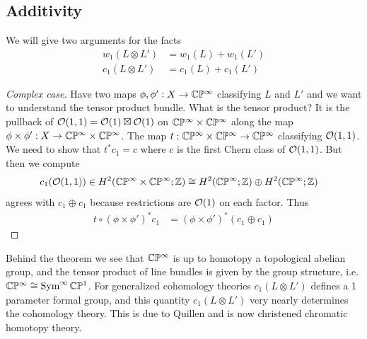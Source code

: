 \documentclass[12pt]{article}
\begin{document}
\subsection{Additivity}
We will give two arguments for the facts \begin{align*}
    w_1(L\otimes L') &= w_1(L) + w_1(L') \\
    c_1(L\otimes L') &= c_1(L) + c_1(L')
\end{align*}

\begin{proof}
    [Complex case] Have two maps $\phi,\phi': X \to \mathbb{C}\mathbb{P}^\infty$ classifying $L$ and $L'$ and we want to understand the tensor product bundle. What is the tensor product? It is the pullback of ${\mathcal{O}}(1,1) = {\mathcal{O}}(1)\boxtimes {\mathcal{O}}(1)$ on $\mathbb{C}\mathbb{P}^\infty \times \mathbb{C}\mathbb{P}^\infty$ along the map $\phi\times \phi': X \to \mathbb{C}\mathbb{P}^\infty \times \mathbb{C}\mathbb{P}^\infty$. The map $t: \mathbb{C}\mathbb{P}^\infty \times \mathbb{C}\mathbb{P}^\infty \to \mathbb{C}\mathbb{P}^\infty$ classifying ${\mathcal{O}}(1,1)$. We need to show that $t^* c_1 = c$ where $c$ is the first Chern class of ${\mathcal{O}}(1,1)$. But then we compute \begin{align*}
        c_1({\mathcal{O}}(1,1)) \in H^2(\mathbb{C}\mathbb{P}^\infty \times \mathbb{C}\mathbb{P}^\infty; \mathbb{Z}) &\cong H^2(\mathbb{C}\mathbb{P}^\infty; \mathbb{Z}) \oplus H^2(\mathbb{C}\mathbb{P}^\infty; \mathbb{Z}) 
    \end{align*} agrees with $c_1 \oplus c_1$ because restrictions are ${\mathcal{O}}(1)$ on each factor. Thus \begin{align*}
        t\circ (\phi\times \phi')^* c_1 &= (\phi\times \phi')^* (c_1 \oplus c_1) 
    \end{align*}
\end{proof}

\begin{remark}
    Behind the theorem we see that $\mathbb{C}\mathbb{P}^\infty$ is up to homotopy a topological abelian group, and the tensor product of line bundles is given by the group structure, i.e. $\mathbb{C}\mathbb{P}^\infty \cong \operatorname{Sym}^\infty \mathbb{C}\mathbb{P}^1$. For generalized cohomology theories $c_1(L\otimes L')$ defines a 1 parameter formal group, and this quantity $c_1(L\otimes L')$ very nearly determines the cohomology theory. This is due to Quillen and is now christened chromatic homotopy theory.
\end{remark}
\end{document}
